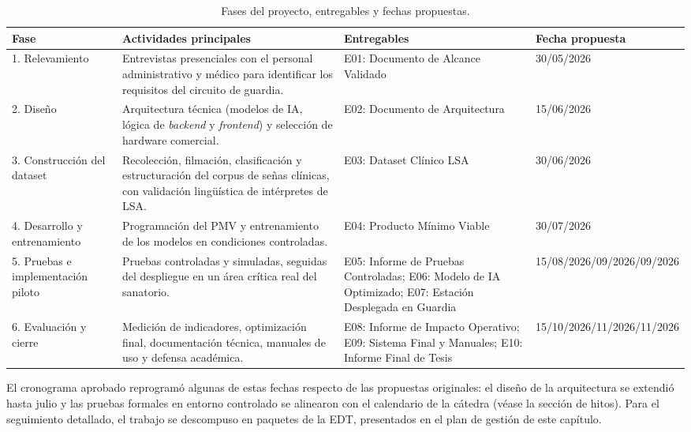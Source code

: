 \begin{table}[htbp]
\centering
\caption{Fases del proyecto, entregables y fechas propuestas.}\label{tab:fases}
\footnotesize
\begin{tabularx}{\textwidth}{@{}p{2.4cm}XXp{2.1cm}@{}}
\toprule
\textbf{Fase} & \textbf{Actividades principales} & \textbf{Entregables} & \textbf{Fecha propuesta} \\
\midrule
1. Relevamiento & Entrevistas presenciales con el personal administrativo y médico para identificar los requisitos del circuito de guardia. & E01: Documento de Alcance Validado & 30/05/2026 \\
2. Diseño & Arquitectura técnica (modelos de IA, lógica de \emph{backend} y \emph{frontend}) y selección de hardware comercial. & E02: Documento de Arquitectura & 15/06/2026 \\
3. Construcción del dataset & Recolección, filmación, clasificación y estructuración del corpus de señas clínicas, con validación lingüística de intérpretes de LSA. & E03: Dataset Clínico LSA & 30/06/2026 \\
4. Desarrollo y entrenamiento & Programación del PMV y entrenamiento de los modelos en condiciones controladas. & E04: Producto Mínimo Viable & 30/07/2026 \\
5. Pruebas e implementación piloto & Pruebas controladas y simuladas, seguidas del despliegue en un área crítica real del sanatorio. & E05: Informe de Pruebas Controladas; E06: Modelo de IA Optimizado; E07: Estación Desplegada en Guardia & 15/08/2026\newline 01/09/2026\newline 15/09/2026 \\
6. Evaluación y cierre & Medición de indicadores, optimización final, documentación técnica, manuales de uso y defensa académica. & E08: Informe de Impacto Operativo; E09: Sistema Final y Manuales; E10: Informe Final de Tesis & 15/10/2026\newline 01/11/2026\newline 15/11/2026 \\
\bottomrule
\end{tabularx}
\end{table}

El cronograma aprobado reprogramó algunas de estas fechas respecto de las propuestas originales: el diseño de la arquitectura se extendió hasta julio y las pruebas formales en entorno controlado se alinearon con el calendario de la cátedra (véase la sección de hitos). Para el seguimiento detallado, el trabajo se descompuso en paquetes de la EDT, presentados en el plan de gestión de este capítulo.

